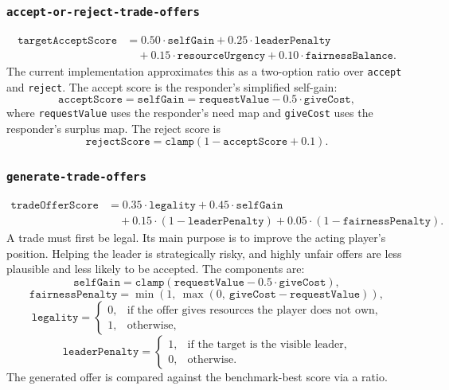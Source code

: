 \documentclass[letter,  12 pt]{article}
\begin{document}
\subsubsection{\texttt{accept-or-reject-trade-offers}}
\label{app:task-accept-or-reject-trade-offers}
\[
\begin{aligned}
\texttt{targetAcceptScore}
&= 0.50 \cdot \texttt{selfGain}
+ 0.25 \cdot \texttt{leaderPenalty} \\
&\quad + 0.15 \cdot \texttt{resourceUrgency}
+ 0.10 \cdot \texttt{fairnessBalance}.
\end{aligned}
\]
The current implementation approximates this as a two-option ratio over \texttt{accept} and \texttt{reject}. The accept score is the responder's simplified self-gain:
\[
\texttt{acceptScore} = \texttt{selfGain}
= \texttt{requestValue} - 0.5 \cdot \texttt{giveCost},
\]
where \texttt{requestValue} uses the responder's need map and \texttt{giveCost} uses the responder's surplus map. The reject score is
\[
\texttt{rejectScore} = \texttt{clamp}(1 - \texttt{acceptScore} + 0.1).
\]

\subsubsection{\texttt{generate-trade-offers}}
\label{app:task-generate-trade-offers}
\[
\begin{aligned}
\texttt{tradeOfferScore}
&= 0.35 \cdot \texttt{legality}
+ 0.45 \cdot \texttt{selfGain} \\
&\quad + 0.15 \cdot (1 - \texttt{leaderPenalty})
+ 0.05 \cdot (1 - \texttt{fairnessPenalty}).
\end{aligned}
\]
A trade must first be legal. Its main purpose is to improve the acting player's position. Helping the leader is strategically risky, and highly unfair offers are less plausible and less likely to be accepted.
The components are:
\[
\texttt{selfGain} = \texttt{clamp}(\texttt{requestValue} - 0.5 \cdot \texttt{giveCost}),
\]
\[
\texttt{fairnessPenalty}
= \min(1,\ \max(0,\ \texttt{giveCost} - \texttt{requestValue})),
\]
\[
\texttt{legality} =
\begin{cases}
0, & \text{if the offer gives resources the player does not own},\\
1, & \text{otherwise},
\end{cases}
\]
\[
\texttt{leaderPenalty} =
\begin{cases}
1, & \text{if the target is the visible leader},\\
0, & \text{otherwise}.
\end{cases}
\]
The generated offer is compared against the benchmark-best score via a ratio.
\end{document}
